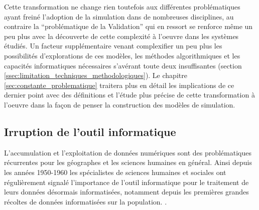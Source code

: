 Cette transformation ne change rien toutefois aux différentes problématiques ayant freiné l'adoption de la simulation dans de nombreuses disciplines, au contraire la \enquote{problématique de la Validation} qui en ressort se renforce même un peu plus avec la découverte de cette complexité à l'oeuvre dans les systèmes étudiés. Un facteur supplémentaire venant complexifier un peu plus les possibilités d'explorations de ces modèles, les méthodes algorithmiques et les capacités informatiques nécessaires s'avérant toute deux insuffisantes (section \ref{ssec:limitation_techniques_methodologiques}). Le chapitre \ref{sec:constante_problematique} traitera plus en détail les implications de ce dernier point avec des définitions et l'étude plus précise de cette transformation à l'oeuvre dans la façon de penser la construction des modèles de simulation.





\subsection{Irruption de l'outil informatique }
\label{sec:apparition_outil_informatique}


L'accumulation et l'exploitation de données numériques sont des problématiques récurrentes pour les géographes et les sciences humaines en général. Ainsi depuis les années 1950-1960 les spécialistes de sciences humaines et sociales ont régulièrement signalé l'importance de l'outil informatique pour le traitement de leurs données désormais informatisées, notamment depuis les premières grandes récoltes de données informatisées sur la population. \autocites{Kao1963, Hagerstrand1967b}[386]{Barnes2011}.

